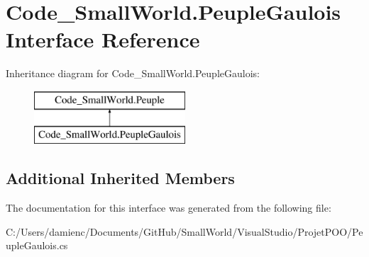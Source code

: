 \hypertarget{interface_code___small_world_1_1_peuple_gaulois}{\section{Code\-\_\-\-Small\-World.\-Peuple\-Gaulois Interface Reference}
\label{interface_code___small_world_1_1_peuple_gaulois}
}
Inheritance diagram for Code\-\_\-\-Small\-World.\-Peuple\-Gaulois\-:\begin{figure}[H]
\begin{center}
\leavevmode
\includegraphics[height=2.000000cm]{interface_code___small_world_1_1_peuple_gaulois}
\end{center}
\end{figure}
\subsection*{Additional Inherited Members}


The documentation for this interface was generated from the following file\-:\begin{DoxyCompactItemize}
\item 
C\-:/\-Users/damienc/\-Documents/\-Git\-Hub/\-Small\-World/\-Visual\-Studio/\-Projet\-P\-O\-O/Peuple\-Gaulois.\-cs\end{DoxyCompactItemize}
